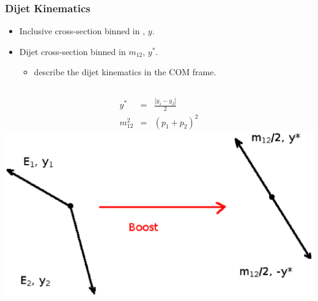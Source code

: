 \documentclass[10pt]{beamer}
\begin{document}
\begin{frame}\frametitle{Dijet Kinematics}

\begin{itemize}
\item Inclusive cross-section binned in \pt, $y$.
\item Dijet cross-section binned in $m_\mathrm{12}$, $y^*$.
\begin{itemize}
\item describe the dijet kinematics in the COM frame.
\end{itemize}
\end{itemize}
\begin{columns}
\begin{eqnarray*}
y^* &=& \frac{|y_1 - y_2|}{2}\\
m_\mathrm{12}^2 &=& \left(p_1 + p_2\right)^2
\end{eqnarray*}
\includegraphics[width=1.0\linewidth,angle=0]{dijet1.eps}
\end{columns}
\end{frame}
\end{document}
